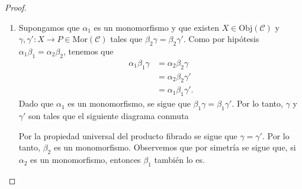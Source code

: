 \documentclass[tesis]{subfiles}
\begin{document}
\begin{proof}\leavevmode
    \begin{enumerate}[label=(\alph*)]
    
    \item Supongamos que $\alpha_1$ es un monomorfismo y que existen $X\in\text{Obj}(\mathscr{C})$ y $\gamma,\gamma':X\to P\in\text{Mor}(\mathscr{C})$ tales que $\beta_2\gamma = \beta_2\gamma'$. Como por hipótesis $\alpha_1\beta_1=\alpha_2\beta_2$, tenemos que
            \begin{align*}
                \alpha_1\beta_1\gamma &= \alpha_2\beta_2\gamma \\
                                        &= \alpha_2\beta_2\gamma' \\
                                        &= \alpha_1\beta_1\gamma'.
            \end{align*}
            Dado que $\alpha_1$ es un monomorfismo, se sigue que $\beta_1\gamma = \beta_1\gamma'$. Por lo tanto, $\gamma$ y $\gamma'$ son tales que el siguiente diagrama conmuta
            \begin{center}
            \end{center}
            Por la propiedad universal del producto fibrado se sigue que $\gamma=\gamma'$. Por lo tanto, $\beta_2$ es un monomorfismo. Observemos que por simetría se sigue que, si $\alpha_2$ es un monomorfismo, entonces $\beta_1$ también lo es.


\end{enumerate}
\end{proof}
\end{document}
